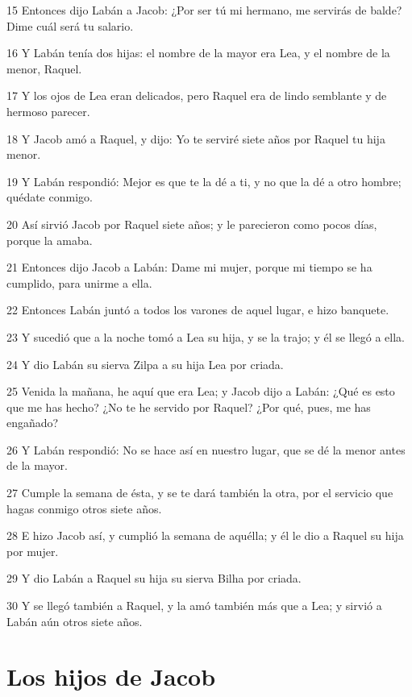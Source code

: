 \par 15 Entonces dijo Labán a Jacob: ¿Por ser tú mi hermano, me servirás de balde? Dime cuál será tu salario.
\par 16 Y Labán tenía dos hijas: el nombre de la mayor era Lea, y el nombre de la menor, Raquel.
\par 17 Y los ojos de Lea eran delicados, pero Raquel era de lindo semblante y de hermoso parecer.
\par 18 Y Jacob amó a Raquel, y dijo: Yo te serviré siete años por Raquel tu hija menor.
\par 19 Y Labán respondió: Mejor es que te la dé a ti, y no que la dé a otro hombre; quédate conmigo.
\par 20 Así sirvió Jacob por Raquel siete años; y le parecieron como pocos días, porque la amaba.
\par 21 Entonces dijo Jacob a Labán: Dame mi mujer, porque mi tiempo se ha cumplido, para unirme a ella.
\par 22 Entonces Labán juntó a todos los varones de aquel lugar, e hizo banquete.
\par 23 Y sucedió que a la noche tomó a Lea su hija, y se la trajo; y él se llegó a ella.
\par 24 Y dio Labán su sierva Zilpa a su hija Lea por criada.
\par 25 Venida la mañana, he aquí que era Lea; y Jacob dijo a Labán: ¿Qué es esto que me has hecho? ¿No te he servido por Raquel? ¿Por qué, pues, me has engañado?
\par 26 Y Labán respondió: No se hace así en nuestro lugar, que se dé la menor antes de la mayor.
\par 27 Cumple la semana de ésta, y se te dará también la otra, por el servicio que hagas conmigo otros siete años.
\par 28 E hizo Jacob así, y cumplió la semana de aquélla; y él le dio a Raquel su hija por mujer.
\par 29 Y dio Labán a Raquel su hija su sierva Bilha por criada.
\par 30 Y se llegó también a Raquel, y la amó también más que a Lea; y sirvió a Labán aún otros siete años.

\section*{Los hijos de Jacob}

